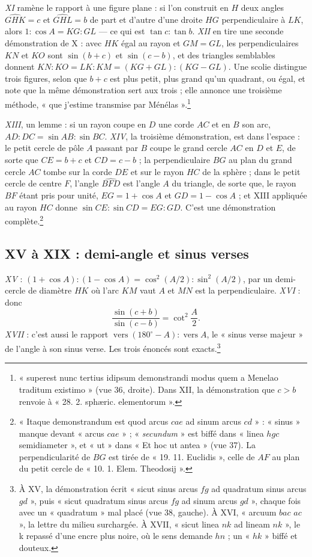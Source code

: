 \documentclass[11pt,a4paper]{article}
\begin{document}
\emph{XI} ramène le rapport à une figure plane : si l'on construit en $H$ deux
angles $\widehat{GHK} = c$ et $\widehat{GHL} = b$ de part et d'autre d'une droite
$HG$ perpendiculaire à $LK$, alors $1 : \cos A = KG : GL$ — ce qui est
$\tan c : \tan b$. \emph{XII} en tire une seconde démonstration de X : avec
$HK$ égal au rayon et $GM = GL$, les perpendiculaires $KN$ et $KO$ sont
$\sin(b+c)$ et $\sin(c-b)$, et des triangles semblables donnent
$KN : KO = LK : KM = (KG+GL) : (KG-GL)$. Une scolie distingue trois figures,
selon que $b + c$ est plus petit, plus grand qu'un quadrant, ou égal, et note que
la même démonstration sert aux trois ; elle annonce une troisième méthode, « que
j'estime transmise par Ménélas ».\footnote{« superest nunc tertius idipsum
demonstrandi modus quem a Menelao traditum existimo » (vue 36, droite). Dans
XII, la démonstration que $c > b$ renvoie à « 28. 2. sphæric. elementorum ».}

\emph{XIII}, un lemme : si un rayon coupe en $D$ une corde $AC$ et en $B$ son arc,
$AD : DC = \sin AB : \sin BC$. \emph{XIV}, la troisième démonstration, est dans
l'espace : le petit cercle de pôle $A$ passant par $B$ coupe le grand cercle $AC$
en $D$ et $E$, de sorte que $CE = b + c$ et $CD = c - b$ ; la perpendiculaire
$BG$ au plan du grand cercle $AC$ tombe sur la corde $DE$ et sur le rayon $HC$
de la sphère ; dans le petit cercle de centre $F$, l'angle $\widehat{BFD}$ est
l'angle $A$ du triangle, de sorte que, le rayon $BF$ étant pris pour unité,
$EG = 1 + \cos A$ et $GD = 1 - \cos A$ ; et XIII appliquée au rayon $HC$ donne
$\sin CE : \sin CD = EG : GD$. C'est une démonstration complète.\footnote{« Itaque
demonstrandum est quod arcus $cae$ ad sinum arcus $cd$ » : « sinus » manque
devant « arcus $cae$ » ; « \emph{secundum} » est biffé dans « linea $hgc$
semidiameter », et « ut » dans « Et hoc ut antea » (vue 37). La perpendicularité
de $BG$ est tirée de « 19. 11. Euclidis », celle de $AF$ au plan du petit cercle
de « 10. 1. Elem. Theodosij ».}

\subsection*{XV à XIX : demi-angle et sinus verses}

\emph{XV} : $(1+\cos A) : (1-\cos A) = \cos^2(A/2) : \sin^2(A/2)$, par un
demi-cercle de diamètre $HK$ où l'arc $KM$ vaut $A$ et $MN$ est la perpendiculaire.
\emph{XVI} : donc
\[
\frac{\sin(c+b)}{\sin(c-b)} = \cot^2\frac{A}{2} .
\]
\emph{XVII} : c'est aussi le rapport $\operatorname{vers}(180^\circ - A) :
\operatorname{vers} A$, le « sinus verse majeur » de l'angle à son sinus verse.
Les trois énoncés sont exacts.\footnote{À XV, la démonstration écrit « sicut
sinus arcus $fg$ ad quadratum sinus arcus $gd$ », puis « sicut quadratum sinus
arcus $fg$ ad sinum arcus $gd$ », chaque fois avec un « quadratum » mal placé
(vue 38, gauche). À XVI, « arcuum $bac$ $ac$ », la lettre du milieu surchargée. À
XVII, « sicut linea $nk$ ad lineam $nk$ », le k repassé d'une encre plus noire, où
le sens demande $hn$ ; un « $hk$ » biffé et douteux.}
\end{document}
